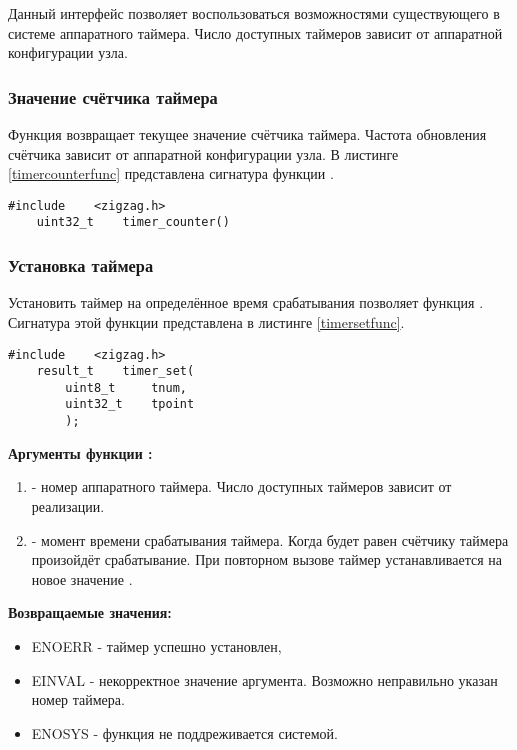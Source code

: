 Данный интерфейс позволяет воспользоваться возможностями существующего в системе аппаратного таймера. Число
доступных таймеров зависит от аппаратной конфигурации узла.

\subsubsection{Значение счётчика таймера}

Функция  возвращает текущее значение счётчика таймера. Частота обновления счётчика
зависит от аппаратной конфигурации узла. В листинге \ref{timercounterfunc} представлена сигнатура функции
.

\begin{lstlisting}[caption=Функция \myfunc{timer\_counter()} - значение счётчика., label=timercounterfunc ]
    #include    <zigzag.h>
    uint32_t    timer_counter()
\end{lstlisting}

\subsubsection{Установка таймера}

Установить таймер на определённое время срабатывания позволяет функция . Сигнатура
этой функции представлена в листинге \ref{timersetfunc}.

\begin{lstlisting}[caption=Функция \myfunc{timer\_set()} - установка таймера., label=timersetfunc ]
    #include    <zigzag.h>
    result_t    timer_set(
        uint8_t     tnum,
        uint32_t    tpoint
        );
\end{lstlisting}

{\bfseries Аргументы функции :}

{\itshape
\begin{enumerate}
\item {} - номер аппаратного таймера. Число доступных таймеров зависит от реализации.
\item {} - момент времени срабатывания таймера. Когда  будет равен счётчику
таймера произойдёт срабатывание. При повторном вызове  таймер устанавливается
на новое значение .
\end{enumerate}
}

{\bfseries Возвращаемые значения:}

{\itshape 
\begin{itemize}
\item ENOERR - таймер успешно установлен,
\item EINVAL - некорректное значение аргумента. Возможно неправильно указан номер таймера.
\item ENOSYS - функция не поддреживается системой.
\end{itemize}
}

